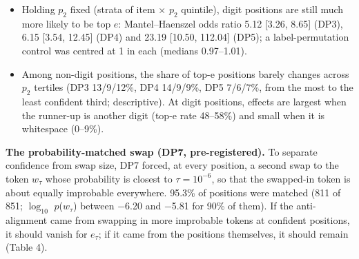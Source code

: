 \documentclass[
  10pt,
  a4paper,
]{article}
\providecommand{\tightlist}{%
  \setlength{\itemsep}{0pt}\setlength{\parskip}{0pt}}
\begin{document}
\begin{itemize}
\tightlist
\item
  Holding \(p_2\) fixed (strata of item × \(p_2\) quintile), digit positions are still much more likely to be top \(e\): Mantel--Haenszel odds ratio 5.12 {[}3.26, 8.65{]} (DP3), 6.15 {[}3.54, 12.45{]}
  (DP4) and 23.19 {[}10.50, 112.04{]} (DP5); a label-permutation control was centred at 1 in each (medians 0.97--1.01).
\item
  Among non-digit positions, the share of top-e positions barely changes across \(p_2\) tertiles (DP3 13/9/12\%, DP4 14/9/9\%, DP5 7/6/7\%, from the most to the least confident third; descriptive). At
  digit positions, effects are largest when the runner-up is another digit (top-e rate 48--58\%) and small when it is whitespace (0--9\%).
\end{itemize}

\textbf{The probability-matched swap (DP7, pre-registered).} To separate confidence from swap size, DP7 forced, at every position, a second swap to the token \(w_{\tau}\) whose probability is closest
to \(\tau = 10^{-6}\), so that the swapped-in token is about equally improbable everywhere. 95.3\% of positions were matched (811 of 851; \(\log_{10}\) \(p\)(\(w_{\tau}\)) between −6.20 and −5.81 for
90\% of them). If the anti-alignment came from swapping in more improbable tokens at confident positions, it should vanish for \(e_{\tau}\); if it came from the positions themselves, it should remain
(Table 4).
\end{document}
